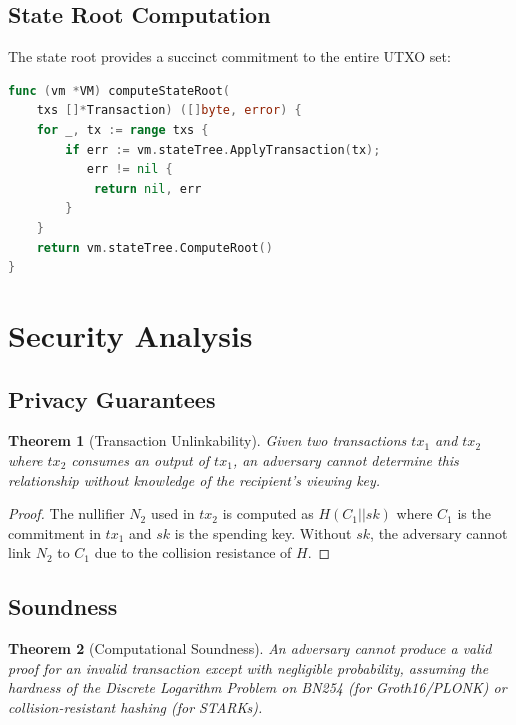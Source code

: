 \documentclass[11pt,a4paper]{article}
\newtheorem{theorem}{Theorem}
\begin{document}
\subsection{State Root Computation}

The state root provides a succinct commitment to the entire UTXO set:

\begin{lstlisting}[language=Go,caption={State Root Computation}]
func (vm *VM) computeStateRoot(
    txs []*Transaction) ([]byte, error) {
    for _, tx := range txs {
        if err := vm.stateTree.ApplyTransaction(tx);
           err != nil {
            return nil, err
        }
    }
    return vm.stateTree.ComputeRoot()
}
\end{lstlisting}

\section{Security Analysis}

\subsection{Privacy Guarantees}

\begin{theorem}[Transaction Unlinkability]
Given two transactions $tx_1$ and $tx_2$ where $tx_2$ consumes an output of $tx_1$, an adversary cannot determine this relationship without knowledge of the recipient's viewing key.
\end{theorem}

\begin{proof}
The nullifier $N_2$ used in $tx_2$ is computed as $H(C_1 || sk)$ where $C_1$ is the commitment in $tx_1$ and $sk$ is the spending key. Without $sk$, the adversary cannot link $N_2$ to $C_1$ due to the collision resistance of $H$.
\end{proof}

\subsection{Soundness}

\begin{theorem}[Computational Soundness]
An adversary cannot produce a valid proof for an invalid transaction except with negligible probability, assuming the hardness of the Discrete Logarithm Problem on BN254 (for Groth16/PLONK) or collision-resistant hashing (for STARKs).
\end{theorem}
\end{document}
